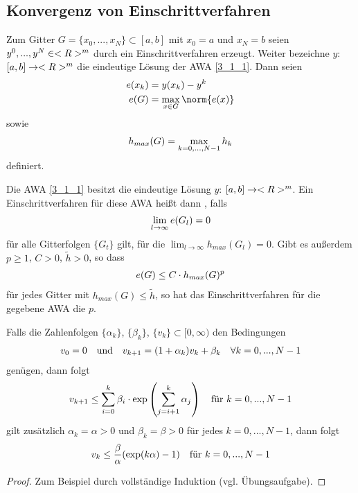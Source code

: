 \subsection{Konvergenz von Einschrittverfahren}

Zum Gitter $G=\{x_0,...,x_N\}\subset [a,b]$ mit $x_0=a$ und $x_N=b$ seien $y^0,...,y^N\in<R>^m$ durch ein Einschrittverfahren erzeugt. Weiter bezeichne $y$: $[a,b]\to<R>^m$ die eindeutige Lösung der AWA \cref{3_1_1}. Dann seien
\begin{align}
	e(x_k) &= y(x_k)-y^k \notag \\
	e(G) &= \max_{x\in G}\norm{e(x)} \notag
\end{align}
sowie
\begin{align}
	h_{max}(G) = \max_{k=0,...,N-1} h_k\notag
\end{align}
definiert.

\begin{definition}[konvergent]
	Die AWA \cref{3_1_1} besitzt die eindeutige Lösung $y$: $[a,b]\to<R>^m$. Ein Einschrittverfahren für diese AWA heißt dann , falls
	\begin{align}
		\lim_{l\to\infty} e(G_l)=0\notag
	\end{align}
	für alle Gitterfolgen $\{G_t\}$ gilt, für die $\lim_{l\to\infty} h_{max}(G_l)=0$. Gibt es außerdem $p\ge 1$, $C>0$, $\tilde{h}>0$, so dass
	\begin{align}
		e(G) \le C\cdot h_{max}(G)^p\notag
	\end{align}
	für jedes Gitter mit $h_{max}(G)\le\tilde{h}$, so hat das Einschrittverfahren für die gegebene AWA die  $p$.
\end{definition}

\begin{lemma}
	Falls die Zahlenfolgen $\{\alpha_k\}$, $\{\beta_k\}$, $\{v_k\}\subset [0,\infty)$ den Bedingungen
	\begin{align}
		v_0=0\quad\text{und}\quad v_{k+1}=(1+\alpha_k)v_k+\beta_k\quad\forall k=0,...,N-1\notag
	\end{align}
	genügen, dann folgt
	\begin{align}
		v_{k+1} \le \sum_{i=0}^{k} \beta_i\cdot \exp\left(\sum_{j=i+1}^{k} \alpha_j\right)\quad\text{für } k=0,...,N-1\notag
	\end{align}
	gilt zusätzlich $\alpha_k=\alpha>0$ und $\beta_k=\beta>0$ für jedes $k=0,...,N-1$, dann folgt
	\begin{align}
		v_k \le \frac{\beta}{\alpha}(\exp(k\alpha)-1)\quad\text{für } k=0,...,N-1\notag
	\end{align}
\end{lemma}
\begin{proof}
	Zum Beispiel durch vollständige Induktion (vgl. Übungsaufgabe).
\end{proof}

